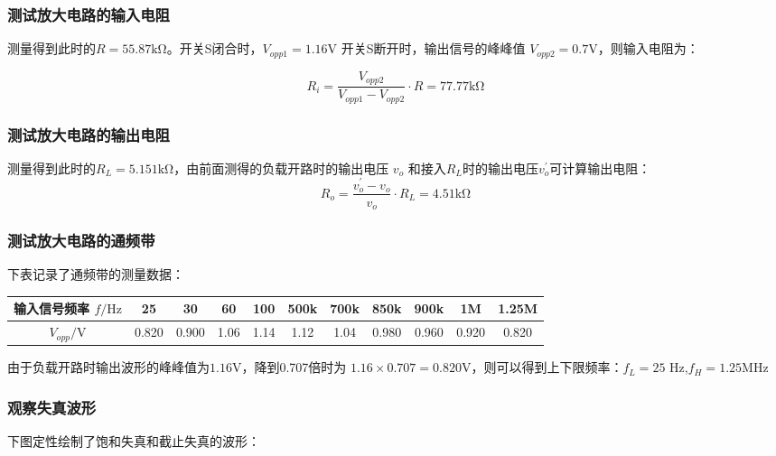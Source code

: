 \documentclass[a4paper,11pt,UTF8]{article}
\numberwithin{equation}{subsection}
\begin{document}
\subsubsection{测试放大电路的输入电阻}
测量得到此时的$R=55.87\mathrm{k\Omega}$。开关S闭合时，$V_{opp1} = 1.16\mathrm{V}$
开关S断开时，输出信号的峰峰值 $V_{opp2} = 0.7\mathrm{V}$，则输入电阻为：

$$
R_{i} = \frac{V_{opp2}}{V_{opp1}-V_{opp2}} \cdot R = 77.77\mathrm{k\Omega}
$$

\subsubsection{测试放大电路的输出电阻}
测量得到此时的$R_L=5.151\mathrm{k\Omega}$，由前面测得的负载开路时的输出电压 $v_{o}$ 
和接入$R_L$时的输出电压$v_{o}^{'}$可计算输出电阻：
$$
R_{o} = \frac{v_{o}^{'}-v_o}{v_o} \cdot R_L = 4.51 \mathrm{k\Omega}
$$

\subsubsection{测试放大电路的通频带}
下表记录了通频带的测量数据：

\begin{table}
	\centering
	\begin{tabular}{|c|c|c|c|c|c|c|c|c|c|c|}
		\hline
		输入信号频率 $f/\mathrm{Hz}$ & 25 & 30 & 60 & 100 & 500k & 700k & 850k & 900k & 1M & 1.25M \\
		\hline
		$V_{opp}/\mathrm{V}$ & 0.820 & 0.900 & 1.06 & 1.14 & 1.12 & 1.04 & 0.980 & 0.960 & 0.920 & 0.820 \\
		\hline
	\end{tabular}
\end{table}

由于负载开路时输出波形的峰峰值为$1.16\mathrm{V}$，降到0.707倍时为
$1.16 \times 0.707 = 0.820\mathrm{V}$，则可以得到上下限频率：$f_L = 25$ Hz,$f_H = 1.25$MHz

\subsubsection{观察失真波形}
下图定性绘制了饱和失真和截止失真的波形：

\begin{figure}[H]
\end{figure}
\end{document}
